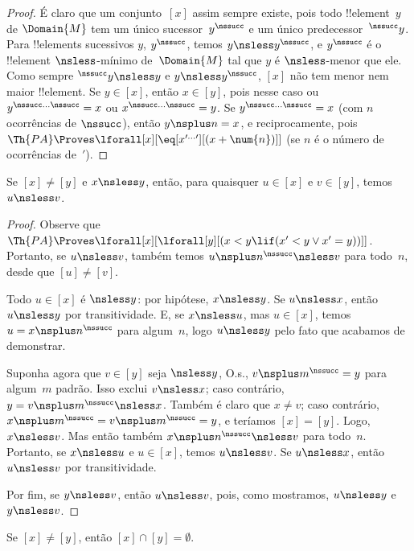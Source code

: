 \documentclass[../../../include/open-logic-section]{subfiles}
\begin{document}
\begin{proof}
É claro que um conjunto~$[x]$ assim sempre existe, pois todo
!!{element}~$y$ de $\Domain{M}$ tem um único sucessor~$y^\nssucc$ e um
único predecessor~$^\nssucc y$. Para !!{element}s sucessivos $y$,
$y^\nssucc$, temos $y \nsless y^\nssucc$, e $y^\nssucc$ é o
!!{element} $\nsless$-mínimo de~$\Domain{M}$ tal que $y$ é
$\nsless$-menor que ele. Como
sempre $^\nssucc y \nsless y$ e $y \nsless y^\nssucc$, $[x]$ não tem
menor nem maior !!{element}. Se $y \in [x]$, então $x \in [y]$, pois
nesse caso ou $y^{\nssucc\dots\nssucc} = x$ ou
$x^{\nssucc\dots\nssucc} = y$. Se $y^{\nssucc\dots\nssucc} = x$ (com
$n$ ocorrências de $\nssucc$), então $y \nsplus n = x$, e
reciprocamente, pois $\Th{PA} \Proves
\lforall[x][\eq[x^{\prime\dots\prime}][(x + \num{n})]]$ (se $n$ é o
número de ocorrências de~$\prime$).
\end{proof}

\begin{prop}
Se $[x] \neq [y]$ e $x \nsless y$, então, para quaisquer $u \in [x]$
e $v \in [y]$, temos $u \nsless v$.
\end{prop}

\begin{proof}
Observe que $\Th{PA} \Proves \lforall[x][\lforall[y][(x < y \lif (x' < y
    \lor x' = y))]]$. Portanto, se $u \nsless v$, também temos
$u \nsplus n^\nssucc \nsless v$ para todo~$n$, desde que
$[u] \neq [v]$.

Todo $u \in [x]$ é $\nsless y$: por hipótese, $x \nsless y$.
Se $u \nsless x$, então $u \nsless y$ por transitividade. E, se
$x \nsless u$, mas $u \in [x]$, temos $u = x\nsplus n^\nssucc$ para
algum~$n$, logo $u \nsless y$ pelo fato que acabamos de demonstrar.
  
Suponha agora que $v \in [y]$ seja $\nsless y$, O.s.\@,
$v \nsplus m^\nssucc = y$ para algum~$m$ padrão. Isso exclui
$v \nsless x$; caso contrário, $y = v \nsplus m^\nssucc \nsless x$.
Também é claro que $x \neq v$; caso contrário,
$x \nsplus m^\nssucc = v \nsplus m^\nssucc = y$, e teríamos
$[x] = [y]$. Logo, $x \nsless v$. Mas então também
$x \nsplus n^\nssucc \nsless v$ para todo~$n$. Portanto, se
$x \nsless u$ e $u \in [x]$, temos $u \nsless v$. Se $u \nsless x$,
então $u \nsless v$ por transitividade.

Por fim, se $y \nsless v$, então $u \nsless v$, pois, como mostramos,
$u \nsless y$ e $y \nsless v$.
\end{proof}

\begin{cor}
Se $[x] \neq [y]$, então $[x] \cap [y] = \emptyset$.
\end{cor}
\end{document}
